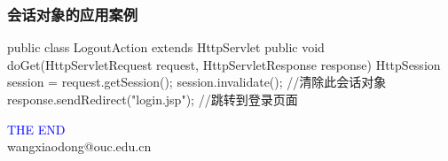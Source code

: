 \begin{frame}[fragile] %
\frametitle{会话对象的应用案例} 

\begin{javaCode}
public class LogoutAction extends HttpServlet {
  public void doGet(HttpServletRequest request, HttpServletResponse response) {
    HttpSession session = request.getSession();
    session.invalidate(); //清除此会话对象
    response.sendRedirect("login.jsp"); //跳转到登录页面
  }
}
\end{javaCode}
\end{frame}
\begin{frame}
\centering
{\Huge \textcolor{blue}{THE END}} \\
\vspace{5mm}
{\Large wangxiaodong@ouc.edu.cn} \\
\end{frame}

